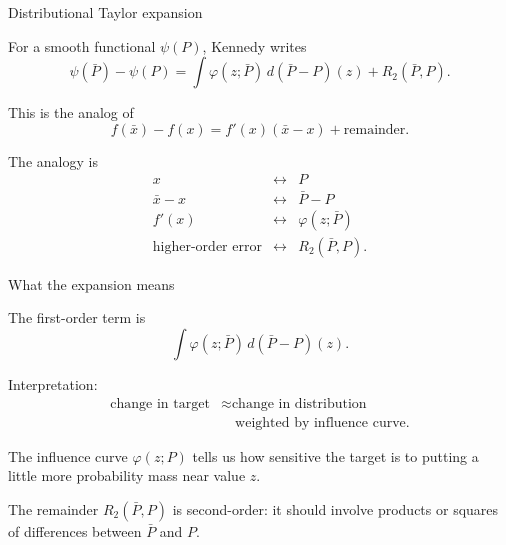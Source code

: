 \documentclass[xcolor={table}, handout]{beamer}
\begin{document}
\note{
\scriptsize \singlespacing

}
\begin{frame}{Distributional Taylor expansion}

\small

\begin{wideitemize}
\item For a smooth functional $\psi(P)$, Kennedy writes
\[
\psi(\bar P)-\psi(P)
  =
  \int \varphi(z;\bar P)\,d(\bar P-P)(z)
  +
  R_2(\bar P,P).
\]\pause
\item This is the analog of
\[
f(\bar x)-f(x)
  =
  f'(x)(\bar x-x)
  +
  \text{remainder}.
\]\pause
\item The analogy is
\[
\begin{array}{ccl}
x & \leftrightarrow & P \\[.08cm]
\bar x-x & \leftrightarrow & \bar P-P \\[.08cm]
f'(x) & \leftrightarrow & \varphi(z;\bar P) \\[.08cm]
\text{higher-order error} & \leftrightarrow & R_2(\bar P,P).
\end{array}
\]
\end{wideitemize}

\end{frame}

\note{
\scriptsize \singlespacing

}
\begin{frame}{What the expansion means}

\small

\begin{wideitemize}
\item The first-order term is
\[
\int \varphi(z;\bar P)\,d(\bar P-P)(z).
\]\pause
\item Interpretation:
\[
\begin{aligned}
\text{change in target}
&\approx
\text{change in distribution} \\
&\quad \text{weighted by influence curve}.
\end{aligned}
\]\pause
\item The influence curve $\varphi(z;P)$ tells us how sensitive the target is to putting a little more probability mass near value $z$.\pause
\item The remainder $R_2(\bar P,P)$ is second-order: it should involve products or squares of differences between $\bar P$ and $P$.
\end{wideitemize}

\end{frame}
\end{document}
